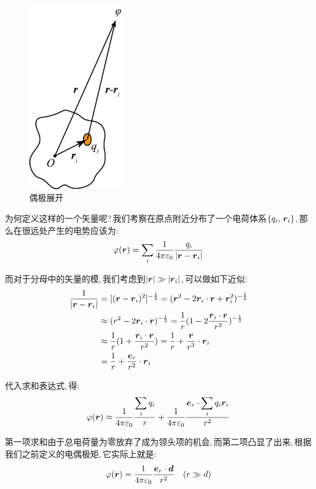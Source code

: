 \begin{figure}
\centering
\vspace{-2.5cm}
\includegraphics[width=4cm]{image/7-1-12.png}
\caption{偶极展开}
\end{figure}
为何定义这样的一个矢量呢?\,我们考察在原点附近分布了一个电荷体系$\{q_i ,\, \boldsymbol{r}_i\}$,\,那么在很远处产生的电势应该为:
\[\varphi(\boldsymbol{r})=\sum_i \frac{1}{4\pi\varepsilon_0} \frac{q_i}{|\boldsymbol{r}-\boldsymbol{r}_i|}\]

而对于分母中的矢量的模,\,我们考虑到$|\boldsymbol{r}|\gg|\boldsymbol{r}_i|$,\,可以做如下近似:
\begin{align*}
\frac{1}{|\boldsymbol{r}-\boldsymbol{r}_i|} 	&=[(\boldsymbol{r}-\boldsymbol{r}_i)^2]^{-\frac{1}{2}}=(\boldsymbol{r}^2-2\boldsymbol{r}_i\cdot\boldsymbol{r}+\boldsymbol{r}_i^2)^{-\frac{1}{2}} \\
								&\approx (r^2-2\boldsymbol{r}_i\cdot\boldsymbol{r})^{-\frac{1}{2}}=\frac{1}{r}(1-2\frac{\boldsymbol{r}_i\cdot\boldsymbol{r}}{r^2})^{-\frac{1}{2}} \\
								&\approx \frac{1}{r}(1+\frac{\boldsymbol{r}_i\cdot\boldsymbol{r}}{r^2})=\frac{1}{r}+\frac{\boldsymbol{r}}{r^3}\cdot \boldsymbol{r}_i \\
								&=\frac{1}{r}+\frac{\boldsymbol{e}_r}{r^2}\cdot \boldsymbol{r}_i
\end{align*}

代入求和表达式,\,得:
\[\varphi(\boldsymbol{r})\approx \frac{1}{4\pi\varepsilon_0} \frac{\displaystyle\sum_i q_i}{r}+\frac{1}{4\pi\varepsilon_0} \frac{\boldsymbol{e}_r\cdot\displaystyle\sum_i q_i \boldsymbol{r}_i}{r^2}\]

第一项求和由于总电荷量为零放弃了成为领头项的机会,\,而第二项凸显了出来,\,根据我们之前定义的电偶极矩,\,它实际上就是:
\[\varphi(\boldsymbol{r})=\frac{1}{4\pi\varepsilon_0} \frac{\boldsymbol{e}_r\cdot\boldsymbol{d}}{r^2} \quad (r\gg d)\]

